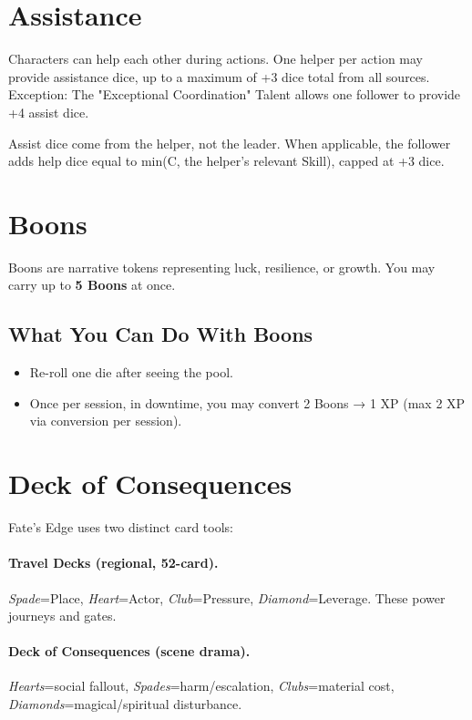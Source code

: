 \section{Assistance}

Characters can help each other during actions. One helper per action may provide assistance dice, up to a maximum of +3 dice total from all sources. Exception: The "Exceptional Coordination" Talent allows one follower to provide +4 assist dice.

Assist dice come from the helper, not the leader. When applicable, the follower adds help dice equal to min(C, the helper's relevant Skill), capped at +3 dice.

\section{Boons}

Boons are narrative tokens representing luck, resilience, or growth. You may carry up to \textbf{5 Boons} at once.

\subsection*{What You Can Do With Boons}

\begin{itemize}
  \item Re-roll one die after seeing the pool.
  \item Once per session, in downtime, you may convert 2 Boons → 1 XP (max 2 XP via conversion per session).
\end{itemize}

\section{Deck of Consequences}

Fate's Edge uses two distinct card tools:

\paragraph{Travel Decks (regional, 52-card).}
\emph{Spade}=Place, \emph{Heart}=Actor, \emph{Club}=Pressure, \emph{Diamond}=Leverage. These power journeys and gates.

\paragraph{Deck of Consequences (scene drama).}
\emph{Hearts}=social fallout, \emph{Spades}=harm/escalation, \emph{Clubs}=material cost, \emph{Diamonds}=magical/spiritual disturbance.

